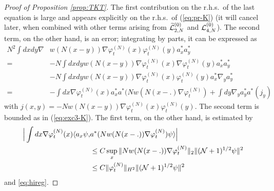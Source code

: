 \documentclass[11pt,a4paper]{article}
\newcommand{\wt}{\widetilde}
\newcommand{\cL}{{\cal L}}
\newcommand{\cN}{{\cal N}}
\newcommand{\ph}{\varphi_t^{(N)}}	%
\begin{document}
\begin{proof}[Proof of Proposition \ref{prop:TKT}]
The first contribution on the r.h.s.\ of the last equation is large and appears explicitly on the r.h.s.\ of (\ref{eq:pr-K}) (it will cancel later, when combined with other terms arising from $\wt{\cL}^{(0)}_{2,N}$ and $\cL^{(0)}_{4,N}$). The second term, on the other hand, is an error; integrating by parts, it can be expressed as
\[ \begin{split} N^2 \int dx dy \nabla &w (N (x-y)) \nabla \varphi^{(N)}_t (x) \varphi_t^{(N)} (y) a_x^* a_y^* \\ = \; &- N \int dx dy  w (N (x-y)) \nabla \varphi^{(N)}_t (x) \nabla \varphi_t^{(N)} (y) a_x^* a_y^* \\ &- N \int dx dy w (N (x-y)) \nabla \varphi^{(N)}_t (x)  \varphi_t^{(N)} (y) a_x^* \nabla_y a_y^*  \\ = \; &- \int dx \nabla \varphi_t^{(N)} (x) a_x^* a^* (N w(N(x-.) \nabla \varphi_t^{(N)}) + \int dy  \nabla_y a_y^* a^* (j_y) \end{split} \]
with $j(x,y) = -N w(N(x-y)) \nabla\ph(x)\ph(y)$. The second term is bounded as in (\ref{eq:exc3-K}). The first term, on the other hand, is estimated by
\begin{equation}\label{eq:lmK-sp} \begin{split}\Big|   \int dx \nabla \varphi_t^{(N)} (x)  \langle a_x \psi, &a^* (N w(N(x-.)) \nabla \varphi_t^{(N)}) \psi \rangle \Big| \\ &\leq C \sup_x \| N w(N(x-.)) \nabla \varphi_t^{(N)} \|_2 \| (\cN+1)^{1/2} \psi \|^2 \\ &\leq C \| \varphi_t^{(N)} \|_{H^2} \| (\cN+1)^{1/2} \psi \|^2   \end{split} \end{equation} and \eqref{eq:hireg}.


\end{proof}
\end{document}
